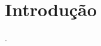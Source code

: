 

\pagestyle{fancy}
\fancyhf{}
\fancyhead[R]{\small\thepage}
\renewcommand{\headrulewidth}{0pt}

\chapter{Introdução} \label{cha:introducao}

\lipsum[1] \cite{bannisterthugge01,winters02}.


